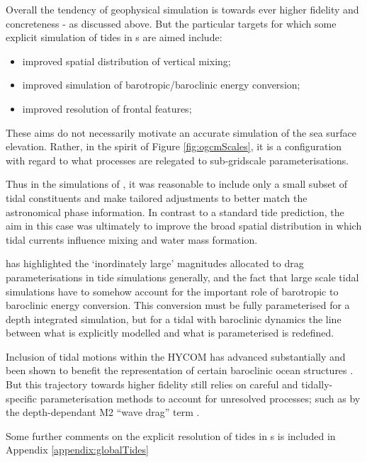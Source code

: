 Overall the tendency of geophysical simulation is towards ever higher fidelity and concreteness - as discussed above. But the particular targets for which some explicit simulation of tides in \OGCM{}s are aimed include:
\begin{itemize}
    \item improved spatial distribution of vertical mixing;
    \item improved simulation of barotropic/baroclinic energy conversion;
    \item improved resolution of frontal features;
\end{itemize}
These aims do not necessarily motivate an accurate simulation of the sea surface elevation.
Rather, in the spirit of Figure \ref{fig:ogcmScales}, it is a configuration with regard to what processes are relegated to sub-gridscale parameterisations.

Thus in the \OFAM{} simulations of \citet{Schiller:2004fv},  it was reasonable to include only a small subset of tidal constituents and make tailored adjustments to better match the astronomical phase information.  In contrast to a standard tide prediction,  the aim in this case was ultimately to improve the broad spatial distribution in which tidal currents influence mixing and water mass formation.

\citet{Arbic:2004wz} has highlighted the `inordinately large' magnitudes allocated to drag parameterisations in tide simulations generally, and the fact that large scale tidal simulations have to somehow account for the important role of barotropic to baroclinic energy conversion.   This conversion must be fully parameterised for a depth integrated simulation, but for a tidal \OGCM{} with baroclinic dynamics the line between what is explicitly modelled and what is parameterised is redefined.  

Inclusion of tidal motions within the HYCOM \OGCM{} has advanced substantially and been shown to benefit the representation of certain baroclinic ocean structures  \citep{10.1016/j.ocemod.2019.02.008}.    But this trajectory towards higher fidelity still relies on careful and tidally-specific parameterisation methods to account for unresolved processes; such as by the depth-dependant M2 ``wave drag'' term \citep{Jayne:2001tr}.

Some further comments on the explicit resolution of tides in \OGCM{}s is included in Appendix \ref{appendix:globalTides}



